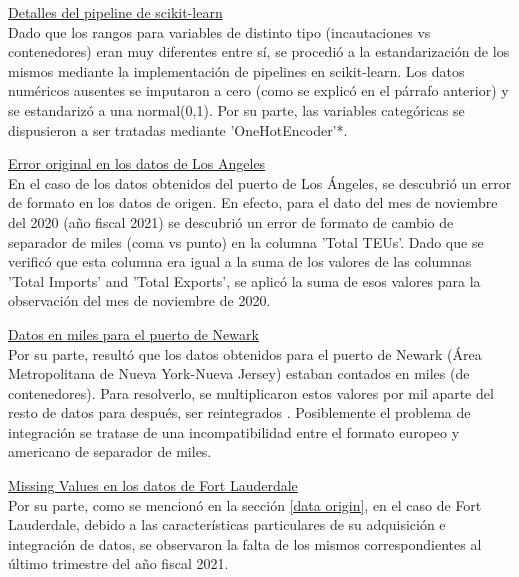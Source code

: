 \documentclass[12pt]{article}
\begin{document}
		\underline{Detalles del pipeline de scikit-learn}\\
		Dado que los rangos para variables de distinto tipo (incautaciones vs contenedores) eran muy diferentes entre sí, se procedió a la estandarización de los mismos mediante la implementación de pipelines en scikit-learn. Los datos numéricos ausentes se imputaron a cero (como se explicó en el párrafo anterior) y se estandarizó a una normal(0,1). Por su parte, las variables categóricas se dispusieron a ser tratadas mediante 'OneHotEncoder'*.
		
		
		\underline{Error original en los datos de Los Angeles}\\
		En el caso de los datos obtenidos del puerto de Los Ángeles, se descubrió un error de formato en los datos de origen. En efecto, para el dato del mes de noviembre del 2020 (año fiscal 2021) se descubrió un error de formato de cambio de separador de miles (coma vs punto) en la columna 'Total TEUs'. Dado que se verificó que esta columna era igual a la suma de los valores de las columnas 'Total Imports' and 'Total Exports', se aplicó la suma de esos valores para la observación del mes de noviembre de 2020.
		
		\underline{Datos en miles para el puerto de Newark}\\
		Por su parte, resultó que los datos obtenidos para el puerto de Newark (Área Metropolitana de Nueva York-Nueva Jersey) estaban contados en miles (de contenedores). Para resolverlo, se multiplicaron estos valores por mil aparte del resto de datos para después, ser reintegrados \cite[]{}. Posiblemente el problema de integración se tratase de una incompatibilidad entre el formato europeo y americano de separador de miles.
		
		\underline{Missing Values en los datos de Fort Lauderdale}\\
		Por su parte, como se mencionó en la sección \ref{data origin}, en el caso de Fort Lauderdale, debido a las características particulares de su adquisición e integración de datos, se observaron la falta de los mismos correspondientes al último trimestre del año fiscal 2021.
		
		
\end{document}
